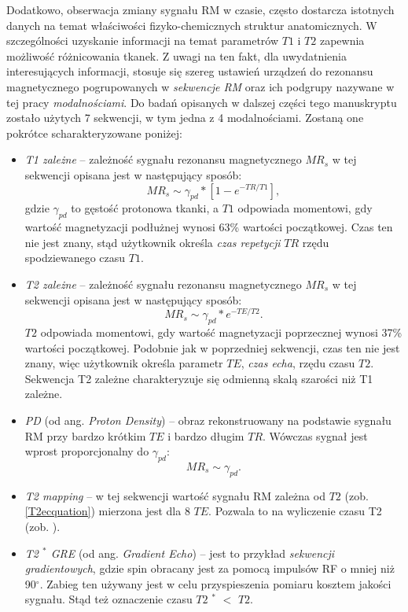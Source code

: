 Dodatkowo, obserwacja zmiany sygnału RM w czasie, często dostarcza istotnych danych na temat właściwości fizyko-chemicznych struktur anatomicznych. W szczególności uzyskanie informacji na temat parametrów $T1$ i $T2$ zapewnia możliwość różnicowania tkanek. Z uwagi na ten fakt, dla uwydatnienia interesujących informacji, stosuje się szereg ustawień urządzeń do rezonansu magnetycznego pogrupowanych w \textit{sekwencje RM} oraz ich podgrupy nazywane w tej pracy \textit{modalnościami}. Do badań opisanych w dalszej części tego manuskryptu zostało użytych 7 sekwencji, w tym jedna z 4 modalnościami. Zostaną one pokrótce scharakteryzowane poniżej:
\begin{itemize}
	\item \textit{T1 zależne} -- zależność sygnału rezonansu magnetycznego $MR_s$ w tej sekwencji opisana jest w następujący sposób: 
	\begin{equation}
		MR_s \sim \gamma_{pd} \ast [1-e^{-TR/T1}],
	\end{equation}
	gdzie $\gamma_{pd}$ to gęstość protonowa tkanki, a $T1$ odpowiada momentowi, gdy wartość magnetyzacji podłużnej wynosi 63\% wartości początkowej. Czas ten nie jest znany, stąd użytkownik określa \textit{czas repetycji} $TR$ rzędu spodziewanego czasu $T1$.
	\item \textit{T2 zależne} -- zależność sygnału rezonansu magnetycznego $MR_s$ w tej sekwencji opisana jest w następujący sposób: 
	\begin{equation}
	\label{T2ecquation}
	MR_s \sim \gamma_{pd} \ast e^{-TE/T2}.
	\end{equation}
	$T2$ odpowiada momentowi, gdy wartość magnetyzacji poprzecznej wynosi 37\% wartości początkowej. Podobnie jak w poprzedniej sekwencji, czas ten nie jest znany, więc użytkownik określa parametr $TE$, \textit{czas echa}, rzędu czasu $T2$. Sekwencja T2 zależne charakteryzuje się odmienną skalą szarości niż T1 zależne.
	\item \textit{PD} (od ang. \textit{Proton Density}) -- obraz rekonstruowany na podstawie sygnału RM przy bardzo krótkim $TE$ i bardzo długim $TR$. Wówczas sygnał jest wprost proporcjonalny do $\gamma_{pd}$:
	\begin{equation}
	MR_s \sim \gamma_{pd}.
	\end{equation}
	\item \textit{T2 mapping} -- w tej sekwencji wartość sygnału RM zależna od $T2$ (zob. \ref{T2ecquation}) mierzona jest dla 8 $TE$. Pozwala to na wyliczenie czasu T2 (zob. \cite{Regulski2017}).
	\item \textit{T2 $^\ast$ GRE} (od ang. \textit{Gradient Echo}) -- jest to przykład \textit{sekwencji gradientowych}, gdzie spin obracany jest za pomocą impulsów RF o mniej niż 90$^\circ$. Zabieg ten używany jest w celu przyspieszenia pomiaru kosztem jakości sygnału. Stąd też oznaczenie czasu $T2$ $^\ast$ $<$ $T2$. 

\end{itemize}
